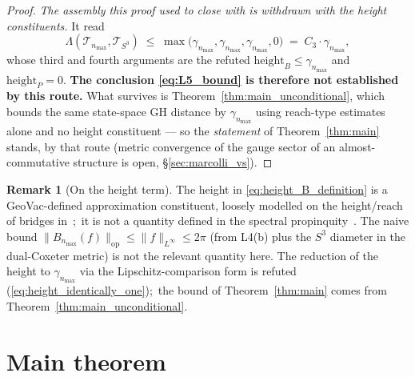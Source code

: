 \documentclass[11pt,a4paper]{article}
\theoremstyle{plain}
\theoremstyle{definition}
\newtheorem{remark}[theorem]{Remark}
\newcommand{\nmax}{n_{\max}}
\newcommand{\sthree}{S^{3}}
\newcommand{\Tcal}{\mathcal{T}}
\newcommand{\opnorm}[1]{\lVert #1 \rVert_{\mathrm{op}}}
\newcommand{\norm}[1]{\lVert #1 \rVert}
\begin{document}
\begin{proof}
\emph{The assembly this proof used to close with is withdrawn with the
height constituents.}  It read
\begin{equation*}
   \Lambda(\Tcal_{\nmax}, \Tcal_{\sthree})
   \;\le\; \max\bigl(\gamma_{\nmax}, \gamma_{\nmax},
   \gamma_{\nmax}, 0\bigr)
   \;=\; C_3 \cdot \gamma_{\nmax},
\end{equation*}
whose third and fourth arguments are the refuted $\mathrm{height}_B \le
\gamma_{\nmax}$ and $\mathrm{height}_P = 0$.  \textbf{The conclusion
\eqref{eq:L5_bound} is therefore not established by this route.}  What
survives is Theorem~\ref{thm:main_unconditional}, which bounds the same
state-space GH distance by $\gamma_{\nmax}$ using reach-type estimates alone
and no height constituent --- so the \emph{statement} of
Theorem~\ref{thm:main} stands, by that route (metric convergence of the gauge sector of an
almost-commutative structure is open, \S\ref{sec:marcolli_vs}).
\end{proof}

\begin{remark}[On the height term]\label{rem:height_definition}
The height in \eqref{eq:height_B_definition} is a GeoVac-defined
approximation constituent, loosely modelled on the height/reach of
bridges in~\cite{latremoliere2016};\ it is not a quantity defined in
the spectral propinquity~\cite{latremoliere_metric_st_2017}.  The naive
bound $\opnorm{B_{\nmax}(f)} \le \norm{f}_{L^\infty} \le 2\pi$ (from
L4(b) plus the $\sthree$ diameter in the dual-Coxeter metric) is not
the relevant quantity here. The reduction of the height to
$\gamma_{\nmax}$ via the Lipschitz-comparison form is refuted
(\eqref{eq:height_identically_one});\ the bound of Theorem~\ref{thm:main}
comes from Theorem~\ref{thm:main_unconditional}.
\end{remark}

\section{Main theorem}\label{sec:main_theorem}
\end{document}
